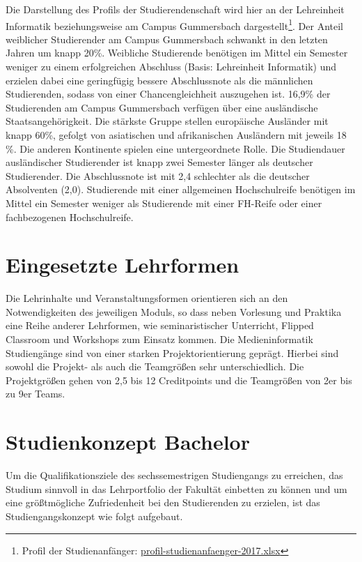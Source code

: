 Die Darstellung des Profils der Studierendenschaft wird hier an der
Lehreinheit Informatik beziehungsweise am Campus Gummersbach
dargestellt\footnote{Profil der Studienanfänger:
  \href{../anhaenge/profil-studienanfaenger-2017.xlsx}{profil-studienanfaenger-2017.xlsx}}.
Der Anteil weiblicher Studierender am Campus Gummersbach schwankt in den
letzten Jahren um knapp 20\%. Weibliche Studierende benötigen im Mittel
ein Semester weniger zu einem erfolgreichen Abschluss (Basis:
Lehreinheit Informatik) und erzielen dabei eine geringfügig bessere
Abschlussnote als die männlichen Studierenden, sodass von einer
Chancengleichheit auszugehen ist. 16,9\% der Studierenden am Campus
Gummersbach verfügen über eine ausländische Staatsangehörigkeit. Die
stärkste Gruppe stellen europäische Ausländer mit knapp 60\%, gefolgt
von asiatischen und afrikanischen Ausländern mit jeweils 18 \%. Die
anderen Kontinente spielen eine untergeordnete Rolle. Die Studiendauer
ausländischer Studierender ist knapp zwei Semester länger als deutscher
Studierender. Die Abschlussnote ist mit 2,4 schlechter als die deutscher
Absolventen (2,0). Studierende mit einer allgemeinen Hochschulreife
benötigen im Mittel ein Semester weniger als Studierende mit einer
FH-Reife oder einer fachbezogenen Hochschulreife.

\section{Eingesetzte Lehrformen}\label{eingesetzte-lehrformen}

Die Lehrinhalte und Veranstaltungsformen orientieren sich an den
Notwendigkeiten des jeweiligen Moduls, so dass neben Vorlesung und
Praktika eine Reihe anderer Lehrformen, wie seminaristischer Unterricht,
Flipped Classroom und Workshops zum Einsatz kommen. Die Medieninformatik
Studiengänge sind von einer starken Projektorientierung geprägt. Hierbei
sind sowohl die Projekt- als auch die Teamgrößen sehr unterschiedlich.
Die Projektgrößen gehen von 2,5 bis 12 Creditpoints und die Teamgrößen
von 2er bis zu 9er Teams.

\section{Studienkonzept Bachelor}\label{studienkonzept-bachelor}

Um die Qualifikationsziele des sechssemestrigen Studiengangs zu
erreichen, das Studium sinnvoll in das Lehrportfolio der Fakultät
einbetten zu können und um eine größtmögliche Zufriedenheit bei den
Studierenden zu erzielen, ist das Studiengangskonzept wie folgt
aufgebaut.


